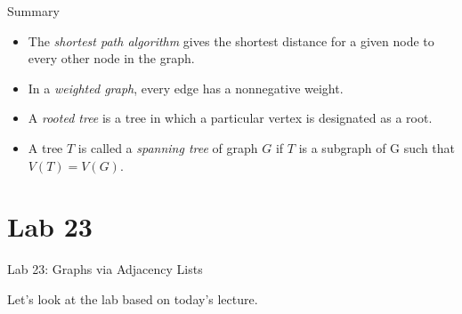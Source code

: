 \documentclass[14pt,aspectratio=1610]{beamer}
\begin{document}
\begin{frame}{Summary}
\begin{itemize}
  \item
    The \emph{shortest path algorithm} gives the shortest distance for a given node to every other node in the graph.
  \item
    In a \emph{weighted graph}, every edge has a nonnegative weight.
  \item
    A \emph{rooted tree} is a tree in which a particular vertex is designated as a root.
  \item
    A tree \(T\) is called a \emph{spanning tree} of graph \(G\) if \(T\) is a subgraph of G such that \(V(T) = V(G)\).

\end{itemize}
\end{frame}

\section*{Lab 23}
\begin{frame}{Lab 23: Graphs via Adjacency Lists}
\begin{center}\Large
Let's look at the lab based on today's lecture.
\end{center}
\end{frame}
\end{document}
